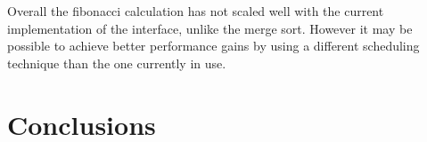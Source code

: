 \documentclass[12pt,twoside,notitlepage]{report}
\begin{document}
% 

%
%

%
%
Overall the fibonacci calculation has not scaled well with the current implementation of the interface, unlike the merge sort. However it may be possible to achieve better performance gains by using a different scheduling technique
than the one currently in use.


\chapter{Conclusions}
\label{chap:conclusions}
%
%
\end{document}
